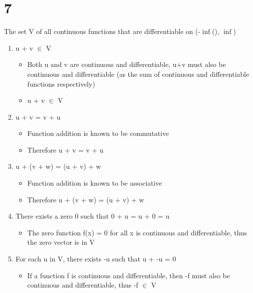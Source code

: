 \documentclass[11pt]{article}
\begin{document}
\section{7}
\label{sec:org34c2579}
The set V of all continuous functions that are differentiable on (-\(\inf\)(), \(\inf\))\\
\begin{enumerate}
\item u + v \(\in\) V\\
\begin{itemize}
\item Both u and v are continuous and differentiable, u+v must also be continuous and differentiable (as the sum of continuous and differentiable functions respectively)\\
\item u + v \(\in\) V\\
\end{itemize}
\item u + v = v + u\\
\begin{itemize}
\item Function addition is known to be commutative\\
\item Therefore u + v = v + u\\
\end{itemize}
\item u + (v + w) = (u + v) + w\\
\begin{itemize}
\item Function addition is known to be associative\\
\item Therefore u + (v + w) = (u + v) + w\\
\end{itemize}
\item There exists a zero 0  such that 0 + u = u + 0 = u\\
\begin{itemize}
\item The zero function f(x) = 0 for all x is continuous and differentiable, thus the zero vector is in V\\
\end{itemize}
\item For each u in V, there exists -u such that u + -u = 0\\
\begin{itemize}
\item If a function f is continuous and differentiable, then -f must also be continuous and differentiable, thus -f \(\in\) V\\

\end{itemize}
\end{enumerate}
\end{document}
